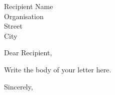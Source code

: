 \documentclass[11pt]{letter}
\begin{document}
\begin{letter}{Recipient Name \\ Organisation \\ Street \\ City}

\opening{Dear Recipient,}

Write the body of your letter here.

\closing{Sincerely,}

\end{letter}
\end{document}
